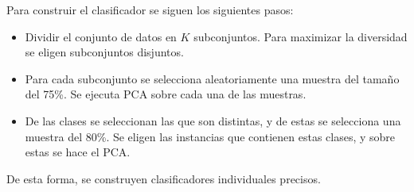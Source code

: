 Para construir el clasificador se siguen los siguientes pasos:
\begin{itemize}
	\item Dividir el conjunto de datos en $K$ subconjuntos. Para maximizar la diversidad se eligen subconjuntos disjuntos. 
	\item Para cada subconjunto se selecciona aleatoriamente una muestra del tamaño del 75\%. Se ejecuta PCA sobre cada una de las muestras.
	\item De las clases se seleccionan las que son distintas, y de estas se selecciona una muestra del 80\%. Se eligen las instancias que contienen estas clases, y sobre estas se hace el PCA.
\end{itemize}

De esta forma, se construyen clasificadores individuales precisos.